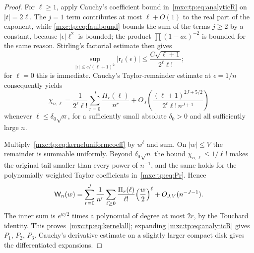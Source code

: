 \documentclass[11pt]{article}
\numberwithin{equation}{section}
\theoremstyle{definition}
\theoremstyle{remark}
\begin{document}
\begin{proof}
For $\ell\ge1$, apply Cauchy's coefficient bound
in~\eqref{mxc:tp:eq:analyticR} on $|t|=2\ell$. The $j=1$ term contributes at
most $\ell+O(1)$ to the real part of the exponent, while
\eqref{mxc:tp:eq:faulbound} bounds the sum of the terms $j\ge2$ by a
constant, because $|\epsilon|\ell^2$ is bounded; the product
$\prod(1-a\epsilon)^{-2}$ is bounded for the same reason. Stirling's
factorial estimate then gives
\begin{equation}\label{mxc:tp:eq:Rbound}
 \sup_{|\epsilon|\le c/(\ell+1)^2}|\mathsf r_\ell(\epsilon)|
 \le\frac{C\sqrt{\ell+1}}{2^\ell\ell!};
\end{equation}
for $\ell=0$ this is immediate. Cauchy's Taylor-remainder estimate at
$\epsilon=1/n$ consequently yields
\begin{equation}\label{mxc:tp:eq:kerneluniformcoeff}
 \chi_{n,\ell}=\frac1{2^\ell\ell!}\sum_{r=0}^{J}\frac{\Pi_r(\ell)}{n^r}
 +O_J\!\left(\frac{(\ell+1)^{2J+5/2}}{2^\ell\ell!\,n^{J+1}}\right)
\end{equation}
whenever $\ell\le\delta_0\sqrt n$, for a sufficiently small absolute
$\delta_0>0$ and all sufficiently large $n$.

Multiply~\eqref{mxc:tp:eq:kerneluniformcoeff} by $w^\ell$ and sum. On
$|w|\le V$ the remainder is summable uniformly. Beyond $\delta_0\sqrt n$
the bound $\chi_{n,\ell}\le1/\ell!$ makes the original tail smaller than
every power of $n^{-1}$, and the same holds for the polynomially weighted
Taylor coefficients in~\eqref{mxc:tp:eq:Pr}. Hence
\[
 \mathsf W_n(w)=\sum_{r=0}^{J}\frac1{n^r}\sum_{\ell\ge0}
 \frac{\Pi_r(\ell)}{\ell!}\Bigl(\frac w2\Bigr)^\ell+O_{J,V}(n^{-J-1}).
\]
The inner sum is $e^{w/2}$ times a polynomial of degree at most $2r$, by
the Touchard identity. This proves~\eqref{mxc:tp:eq:kernelall}; expanding
\eqref{mxc:tp:eq:analyticR} gives $P_1$, $P_2$, $P_3$. Cauchy's derivative
estimate on a slightly larger compact disk gives the differentiated
expansions.
\end{proof}
\end{document}
